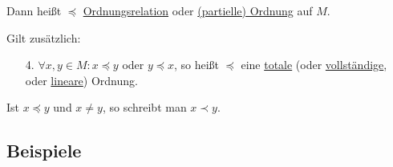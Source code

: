\documentclass[a4paper, 12pt, twoside] {article}
\begin{document}
Dann heißt $\preceq$ \underline{Ordnungsrelation} oder \underline{(partielle) Ordnung} auf $M$.

Gilt zusätzlich:

\begin{enumerate}

\item[4.] $\forall x, y \in M: x \preceq y$ oder $y \preceq x$,
so heißt $\preceq$ eine \underline{totale} (oder \underline{vollständige}, oder \underline{lineare}) Ordnung.
\end{enumerate}


Ist $x \preceq y$ und $x \neq y$, so schreibt man $x \prec y$.

\subsection{Beispiele} %
\end{document}
